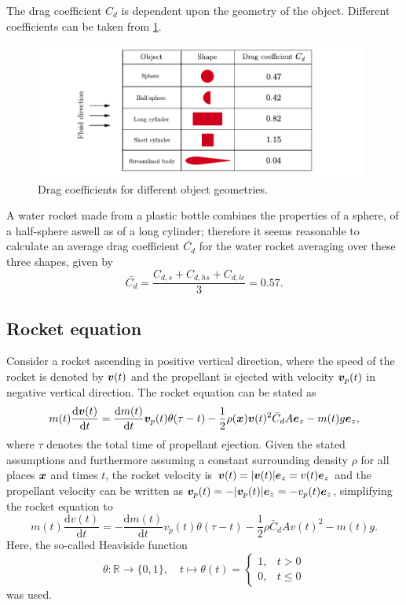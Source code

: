 \documentclass[a4paper,11pt]{report}
\begin{document}
The drag coefficient $C_d$ is dependent upon the geometry of the object. Different coefficients can be taken from \cref{fig:dragcoefficients}.
\begin{figure}[h!]
\centering
\includegraphics[width=11cm]{figures/dragcoefficients.pdf}
\caption{Drag coefficients for different object geometries.}
\label{fig:dragcoefficients}
\end{figure} A water rocket made from a plastic bottle combines the properties of a sphere, of a half-sphere aswell as of a long cylinder; therefore it seems reasonable to calculate an average drag coefficient $\bar{C_{d}}$ for the water rocket averaging over these three shapes, given by \begin{equation}\label{eq:avdragvalue}
\bar{C_{d}} = \frac{C_{d,s}+C_{d,hs}+C_{d,lc}}{3} = 0.57.
\end{equation}

\subsection{Rocket equation}
Consider a rocket ascending in positive vertical direction, where the speed of the rocket is denoted by $\bm{v}(t)$ and the propellant is ejected with velocity $\bm{v}_p(t)$ in negative vertical direction. The rocket equation can be stated as \begin{equation}
m(t)\frac{\mathrm{d}\bm{v}(t)}{\mathrm{d}t} = \frac{\mathrm{d}m(t)}{\mathrm{d}t}\bm{v}_p(t)\theta(\tau-t) - \frac{1}{2}\rho(\bm{x})\bm{v}(t)^2\bar{C}_dA\bm{e}_z - m(t)g\bm{e}_z, 
\end{equation} where $\tau$ denotes the total time of propellant ejection. Given the stated assumptions and furthermore assuming a constant surrounding density $\rho$ for all places $\bm{x}$ and times $t$, the rocket velocity is $\bm{v}(t) = |\bm{v}(t)|\bm{e}_z = v(t)\bm{e}_z$ and the propellant velocity can be written as $\bm{v}_p(t) = -|\bm{v}_p(t)|\bm{e}_z = -v_p(t)\bm{e}_z$, simplifying the rocket equation to \begin{equation}\label{eq:rocketeqsimple}
m(t)\frac{\mathrm{d}v(t)}{\mathrm{d}t} = -\frac{\mathrm{d}m(t)}{\mathrm{d}t}v_p(t)\theta(\tau-t) - \frac{1}{2}\rho \bar{C}_d A v(t)^2 - m(t) g.
\end{equation} Here, the so-called Heaviside function
\begin{equation}\label{eq:defheaviside}
\theta: \mathbb{R} \rightarrow \{0,1\}, \quad t \mapsto \theta(t) = \begin{cases}
1, & t > 0 \\
0, & t \leq 0
\end{cases}
\end{equation} was used.
\end{document}
